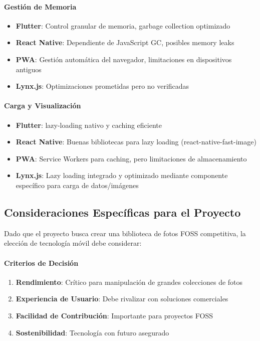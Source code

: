 \paragraph{Gestión de Memoria}
\begin{itemize}
    \item \textbf{Flutter}: Control granular de memoria, garbage collection optimizado
    \item \textbf{React Native}: Dependiente de JavaScript GC, posibles memory leaks
    \item \textbf{PWA}: Gestión automática del navegador, limitaciones en dispositivos antiguos
    \item \textbf{Lynx.js}: Optimizaciones prometidas pero no verificadas
\end{itemize}

\paragraph{Carga y Visualización}
\begin{itemize}
    \item \textbf{Flutter}: \Gls{lazy-loading} nativo y caching eficiente
    \item \textbf{React Native}: Buenas bibliotecas para lazy loading (react-native-fast-image)
    \item \textbf{PWA}: Service Workers para caching, pero limitaciones de almacenamiento
    \item \textbf{Lynx.js}: Lazy loading integrado y optimizado mediante componente específico para carga de datos/imágenes
\end{itemize}

\subsection{Consideraciones Específicas para el Proyecto}

Dado que el proyecto busca crear una biblioteca de fotos FOSS competitiva, la elección de tecnología móvil debe considerar:

\paragraph{Criterios de Decisión}
\begin{enumerate}
    \item \textbf{Rendimiento}: Crítico para manipulación de grandes colecciones de fotos
    \item \textbf{Experiencia de Usuario}: Debe rivalizar con soluciones comerciales
    \item \textbf{Facilidad de Contribución}: Importante para proyectos FOSS
    \item \textbf{Sostenibilidad}: Tecnología con futuro asegurado
\end{enumerate}

